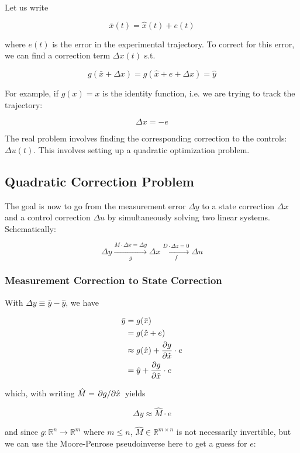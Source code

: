 \documentclass{article}
\begin{document}
Let us write

$$
\bar x (t) = \hat x (t) + e(t)
$$


where $e(t)$ is the error in the experimental trajectory.  To correct for this error, we can find a correction term $\Delta x(t)$ s.t.

$$
g(\bar x + \Delta x) = g(\hat x + e + \Delta x ) = \hat y
$$

For example, if $g(x) = x$ is the identity function, i.e. we are trying to track the trajectory:

$$
\Delta x = -e 
$$

The real problem involves finding the corresponding correction to the controls: $\Delta u(t)$. This involves setting up a quadratic optimization problem.

\newpage
\subsection*{Quadratic Correction Problem}

The goal is now to go from the measurement error $\Delta y$ to a state correction $\Delta x$ and a control correction $\Delta u$ by simultaneously solving two linear systems.  Schematically:

$$
\Delta y \xrightarrow[g]{M \cdot \Delta x = \Delta y} \Delta x \xrightarrow[f]{D \cdot \Delta z = 0} \Delta u
$$

\subsubsection*{Measurement Correction to State Correction}

With $\Delta y \equiv \bar y - \hat y$, we have

\begin{align*}
  \bar y &= g(\bar x) \\
  &= g(\hat x + e) \\ 
  &\approx g(\hat x) + \pdv{g}{\hat x} \cdot e \\
  &= \hat y + \pdv{g}{\hat x} \cdot e  
\end{align*}

 
which, with writing $\hat M = \pdv*{g}{\hat x} $ yields

$$
\Delta y \approx \hat M \cdot e 
$$


and since $g: \mathbb{R}^n \to \mathbb{R}^m$ where $m \leq n$, $\hat M \in \mathbb{R}^{m \times n}$ is not necessarily invertible, but we can use the Moore-Penrose pseudoinverse here to get a guess for $e$:
\end{document}
